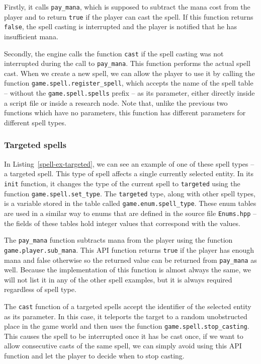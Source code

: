 Firstly, it calls \texttt{pay\_mana},
which is supposed to subtract the mana cost from the player and to return \texttt{true} if the player can cast the spell. If this function
returns \texttt{false}, the spell casting is interrupted and the player is notified that he has insufficient mana.

Secondly, the engine calls the function \texttt{cast} if the spell casting was not interrupted during the call to \texttt{pay\_mana}. This
function performs the actual spell cast. When we create a new spell, we can allow the player to use it by calling the function
\texttt{game.spell.register\_spell}, which accepts the name of the spell table -- without the \texttt{game.spell.spells} prefix -- as its
parameter, either directly inside a script file or inside a research node. Note that, unlike the previous two functions which have no
parameters, this function has different parameters for different spell types.

\subsubsection{Targeted spells}

In Listing~\ref{spell-ex-targeted}, we can see an example of one of these spell types -- a targeted spell. This type of spell  affects a
single currently selected entity. In its \texttt{init} function, it changes the type of the current spell to \texttt{targeted} using
the function \texttt{game.spell.set\_type}. The \texttt{targeted} type, along with other spell types, is a variable stored in the
table called \texttt{game.enum.spell\_type}. These enum tables are used in a similar way to \cpp enums that are defined in the source file
\texttt{Enums.hpp} -- the fields of these tables hold integer values that correspond with the \cpp values.

The \texttt{pay\_mana} function subtracts mana from the player using the function \texttt{game.player.sub\_mana}. This API function returns
\texttt{true} if the player has enough mana and false otherwise so the returned value can be returned from \texttt{pay\_mana} as well.
Because the implementation of this function is almost always the same, we will not list it in any of the other spell examples, but it is
always required regardless of spell type.

The \texttt{cast} function of a targeted spells accept the identifier of the selected entity as its parameter. In this case, it teleports
the target to a random unobstructed place in the game world and then uses the function \texttt{game.spell.stop\_casting}. This causes the
spell to be interrupted once it has be cast once, if we want to allow consecutive casts of the same spell, we can simply avoid using this
API function and let the player to decide when to stop casting.

